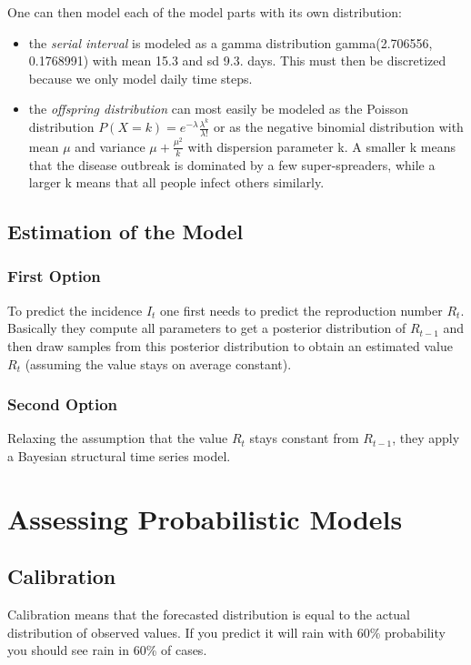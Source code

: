 One can then model each of the model parts with its own distribution: 

\begin{itemize}
\item the \textit{serial interval} is modeled as a gamma distribution gamma(2.706556, 0.1768991) with mean 15.3 and sd 9.3. days. This must then be discretized because we only model daily time steps. 
\item the \textit{offspring distribution} can most easily be modeled as the Poisson distribution $P(X = k) = e^{-\lambda} \frac{\lambda ^ k}{\lambda !}$ or as the negative binomial distribution with mean $\mu$ and variance $\mu +  \frac{\mu^2}{k}$ with dispersion parameter k. A smaller k means that the disease outbreak is dominated by a few super-spreaders, while a larger k means that all people infect others similarly. 
\end{itemize}


\section{Estimation of the Model}
\subsection{First Option}
To predict the incidence $I_t$ one first needs to predict the reproduction number $R_t$. Basically they compute all parameters to get a posterior distribution of $R_{t-1}$ and then draw samples from this posterior distribution to obtain an estimated value $R_t$ (assuming the value stays on average constant). 

\subsection{Second Option}
Relaxing the assumption that the value $R_t$ stays constant from $R_{t-1}$, they apply a Bayesian structural time series model.  


\chapter{Assessing Probabilistic Models}

\section{Calibration}
Calibration means that the forecasted distribution is equal to the actual distribution of observed values. If you predict it will rain with 60\% probability you should see rain in 60\% of cases. 

